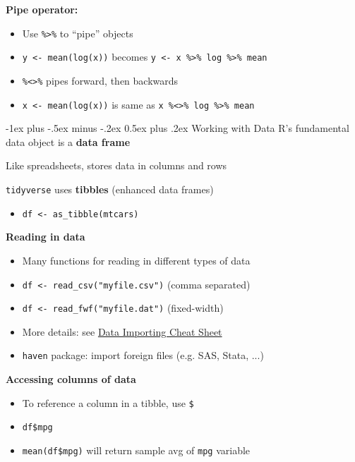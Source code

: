 \documentclass[10pt,landscape]{article}
\makeatletter
\renewcommand{\section}{\@startsection{section}{1}{0mm}%
                                {-1ex plus -.5ex minus -.2ex}%
                                {0.5ex plus .2ex}%
                                {\normalfont\large\bfseries}}
\makeatother
\begin{document}
\begin{multicols}{3}
\smallskip{}

\textbf{Pipe operator:}\\
\begin{itemize}
    \item Use \verb!%>%! to ``pipe'' objects
    \item[] \verb!y <- mean(log(x))! becomes \verb!y <- x %>% log %>% mean!
    \item \verb!%<>%! pipes forward, then backwards
    \item[] \verb!x <- mean(log(x))! is same as \verb!x %<>% log %>% mean!
\end{itemize}

\section{Working with Data}
R's fundamental data object is a \textbf{data frame}

\smallskip{}

Like spreadsheets, stores data in columns and rows

\smallskip{}

\verb!tidyverse! uses \textbf{tibbles} (enhanced data frames)
\begin{itemize}
    \item[] \verb!df <- as_tibble(mtcars)!
\end{itemize}

\smallskip{}

\textbf{Reading in data}\\
\begin{itemize}
    \item Many functions for reading in different types of data
    \item[] \verb!df <- read_csv("myfile.csv")! (comma separated)
    \item[] \verb!df <- read_fwf("myfile.dat")! (fixed-width)
    \item More details: see \href{https://rawgit.com/rstudio/cheatsheets/master/data-import.pdf}{Data Importing Cheat Sheet}
    \item \verb!haven! package: import foreign files (e.g. SAS, Stata, ...)
\end{itemize}

\smallskip{}

\textbf{Accessing columns of data}\\
\begin{itemize}
    \item To reference a column in a tibble, use \verb!$!
    \item[] \verb!df$mpg!
    \item[] \verb!mean(df$mpg)! will return sample avg of \verb!mpg! variable
\end{itemize}


\end{multicols}
\end{document}
